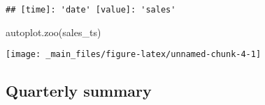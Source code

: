 \documentclass[
]{book}
\newenvironment{Shaded}{\begin{snugshade}}{\end{snugshade}}
\newcommand{\FunctionTok}[1]{\textcolor[rgb]{0.00,0.00,0.00}{#1}}
\newcommand{\NormalTok}[1]{#1}
\begin{document}
\begin{verbatim}
## [time]: 'date' [value]: 'sales'
\end{verbatim}

\begin{Shaded}
\begin{Highlighting}[]
\FunctionTok{autoplot.zoo}\NormalTok{(sales\_ts)}
\end{Highlighting}
\end{Shaded}

\begin{center}\texttt{[image: \_main\_files/figure-latex/unnamed-chunk-4-1]} \end{center}

\hypertarget{quarterly-summary}{%
\subsection{Quarterly summary}\label{quarterly-summary}}

  
\end{document}

